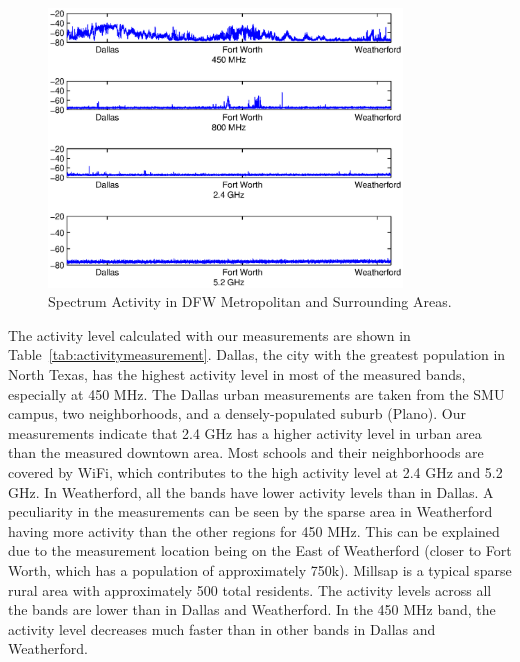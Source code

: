 \begin{figure}
\centering
\includegraphics[width=94mm]{figures/drivetest}
\vspace{-0.4in}
\caption{Spectrum Activity in DFW Metropolitan and Surrounding Areas.}                                                                 
\label{fig:drivetest}
\vspace{-0.3in}
\end{figure}





The activity level calculated with our measurements are shown in Table~\ref{tab:activitymeasurement}. Dallas, the 
city with the greatest population in North Texas, has the highest activity level in most of the measured bands, 
especially at 450 MHz. The Dallas urban measurements are taken from the SMU campus, two neighborhoods, and a 
densely-populated suburb (Plano). Our measurements indicate that 2.4 GHz has a higher activity level in urban area 
than the measured downtown area. Most schools and their neighborhoods are covered by WiFi, which contributes to the 
high activity level at 2.4 GHz and 5.2 GHz. In Weatherford, all the bands have lower activity levels than in Dallas. 
A peculiarity in the measurements can be seen by the sparse area in Weatherford having more activity than the other 
regions for 450 MHz. This can be explained due to the measurement location being on the East of Weatherford (closer 
to Fort Worth, which has a population of approximately 750k). Millsap is a typical sparse rural area with approximately 
500 total residents. The activity levels across all the bands are lower than in Dallas and Weatherford. In the 450 MHz 
band, the activity level decreases much faster than in other bands in Dallas and Weatherford. 

